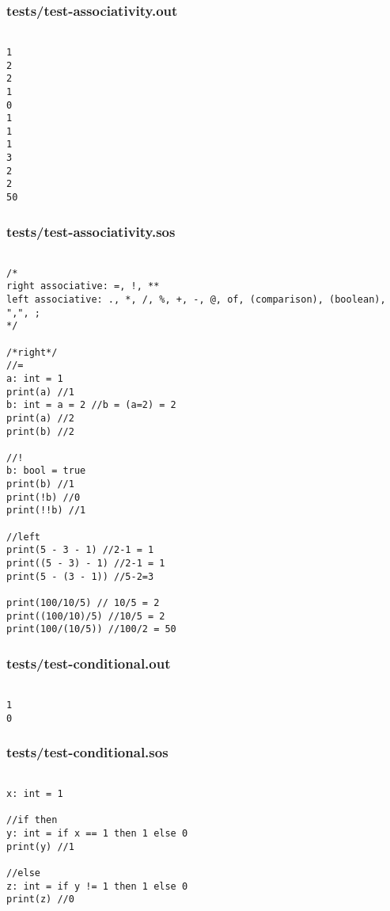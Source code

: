 \documentclass[main.tex]{subfiles}
\begin{document}
\subsubsection{tests/test-associativity.out}

\begin{lstlisting}

1
2
2
1
0
1
1
1
3
2
2
50
\end{lstlisting}

\subsubsection{tests/test-associativity.sos}

\begin{lstlisting}

/* 
right associative: =, !, **
left associative: ., *, /, %, +, -, @, of, (comparison), (boolean), ",", ;
*/

/*right*/
//=
a: int = 1
print(a) //1
b: int = a = 2 //b = (a=2) = 2
print(a) //2
print(b) //2

//!
b: bool = true
print(b) //1
print(!b) //0
print(!!b) //1

//left
print(5 - 3 - 1) //2-1 = 1
print((5 - 3) - 1) //2-1 = 1
print(5 - (3 - 1)) //5-2=3

print(100/10/5) // 10/5 = 2
print((100/10)/5) //10/5 = 2
print(100/(10/5)) //100/2 = 50
\end{lstlisting}

\subsubsection{tests/test-conditional.out}

\begin{lstlisting}

1
0
\end{lstlisting}

\subsubsection{tests/test-conditional.sos}

\begin{lstlisting}

x: int = 1

//if then
y: int = if x == 1 then 1 else 0
print(y) //1

//else
z: int = if y != 1 then 1 else 0
print(z) //0
\end{lstlisting}
\end{document}
